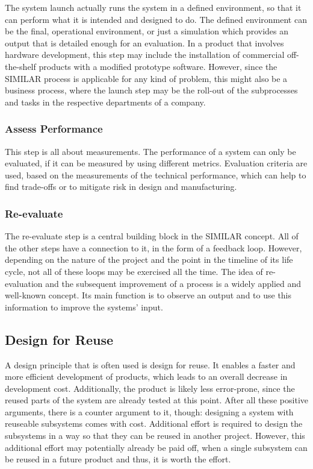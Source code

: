 The system launch actually runs the system in a defined environment, so that it can perform what it is intended and designed to do.
The defined environment can be the final, operational environment, or just a simulation which provides an output that is detailed enough for an evaluation.
In a product that involves hardware development, this step may include the installation of commercial off-the-shelf products with a modified prototype software.
However, since the SIMILAR process is applicable for any kind of problem, this might also be a business process, where the launch step may be the roll-out of the subprocesses and tasks in the respective departments of a company.

\subsubsection{Assess Performance}

This step is all about measurements.
The performance of a system can only be evaluated, if it can be measured by using different metrics.
Evaluation criteria are used, based on the measurements of the technical performance, which can help to find trade-offs or to mitigate risk in design and manufacturing.

\subsubsection{Re-evaluate}

The re-evaluate step is a central building block in the SIMILAR concept.
All of the other steps have a connection to it, in the form of a feedback loop.
However, depending on the nature of the project and the point in the timeline of its life cycle, not all of these loops may be exercised all the time.
The idea of re-evaluation and the subsequent improvement of a process is a widely applied and well-known concept.
Its main function is to observe an output and to use this information to improve the systems' input.

\subsection{Design for Reuse}

A design principle that is often used is design for reuse.
It enables a faster and more efficient development of products, which leads to an overall decrease in development cost.
Additionally, the product is likely less error-prone, since the reused parts of the system are already tested at this point.
After all these positive arguments, there is a counter argument to it, though: designing a system with reuseable subsystems comes with cost.
Additional effort is required to design the subsystems in a way so that they can be reused in another project.
However, this additional effort may potentially already be paid off, when a single subsystem can be reused in a future product and thus, it is worth the effort.

